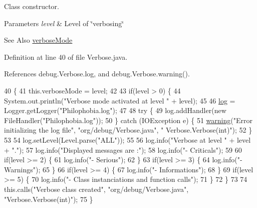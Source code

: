 Class constructor. 


\begin{DoxyParams}{Parameters}
{\em level} & Level of \char`\"{}verbosing\char`\"{} \\
\hline
\end{DoxyParams}
\begin{DoxySeeAlso}{See Also}
\hyperlink{classdebug_1_1_verbose_a2269eebcfd65682c66c8401d59bb0d70}{verbose\-Mode} 
\end{DoxySeeAlso}


Definition at line 40 of file Verbose.\-java.



References debug.\-Verbose.\-log, and debug.\-Verbose.\-warning().


\begin{DoxyCode}
40                               \{
41         this.verboseMode = level;
42 
43         \textcolor{keywordflow}{if}(level > 0) \{
44             System.out.println(\textcolor{stringliteral}{"Verbose mode activated at level "} + level);
45             
46                 \hyperlink{classdebug_1_1_verbose_a1642fc3a3308caeb65e4d837675591e5}{log} = Logger.getLogger(\textcolor{stringliteral}{"Philophobia.log"});
47                 
48                 \textcolor{keywordflow}{try} \{
49                     log.addHandler(\textcolor{keyword}{new} FileHandler(\textcolor{stringliteral}{"Philophobia.log"}));
50                 \} \textcolor{keywordflow}{catch} (IOException e) \{
51                     \hyperlink{classdebug_1_1_verbose_a178f9afaeb03db850592a967ab911dee}{warning}(\textcolor{stringliteral}{"Error initializing the log file"}, \textcolor{stringliteral}{"org/debug/Verbose.java"}, \textcolor{stringliteral}{"
      Verbose.Verbose(int)"});
52                 \}
53 
54                 log.setLevel(Level.parse(\textcolor{stringliteral}{"ALL"}));
55 
56                 log.info(\textcolor{stringliteral}{"Verbose at level "} + level + \textcolor{stringliteral}{"."});
57                 log.info(\textcolor{stringliteral}{"Displayed messages are :"});
58                 log.info(\textcolor{stringliteral}{"- Criticals"});
59 
60                 \textcolor{keywordflow}{if}(level >= 2) \{
61                     log.info(\textcolor{stringliteral}{"- Serious"});
62                 \}
63                 \textcolor{keywordflow}{if}(level >= 3) \{
64                     log.info(\textcolor{stringliteral}{"- Warnings"});
65                 \}
66                 \textcolor{keywordflow}{if}(level >= 4) \{
67                     log.info(\textcolor{stringliteral}{"- Informations"});
68                 \}
69                 \textcolor{keywordflow}{if}(level >= 5) \{
70                     log.info(\textcolor{stringliteral}{"- Class instanciations and function calls"});
71                 \}
72         \}
73 
74         this.calls(\textcolor{stringliteral}{"Verbose class created"}, \textcolor{stringliteral}{"org/debug/Verbose.java"}, \textcolor{stringliteral}{"Verbose.Verbose(int)"});
75     \}
\end{DoxyCode}


